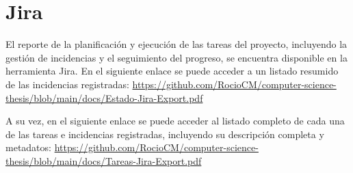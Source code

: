 \section{Jira}

El reporte de la planificación y ejecución de las tareas del proyecto, incluyendo la gestión de incidencias y el seguimiento del progreso, se encuentra disponible en la herramienta Jira. En el siguiente enlace se puede acceder a un listado resumido de las incidencias registradas: \href{https://github.com/RocioCM/computer-science-thesis/blob/main/docs/Estado-Jira-Export.pdf}{https://github.com/RocioCM/computer-science-thesis/blob/main/docs/Estado-Jira-Export.pdf}

A su vez, en el siguiente enlace se puede acceder al listado completo de cada una de las tareas e incidencias registradas, incluyendo su descripción completa y metadatos: \href{https://github.com/RocioCM/computer-science-thesis/blob/main/docs/Tareas-Jira-Export.pdf}{https://github.com/RocioCM/computer-science-thesis/blob/main/docs/Tareas-Jira-Export.pdf}